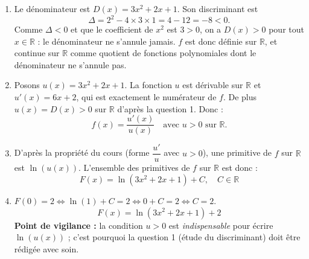 \documentclass[11pt]{article}
\begin{document}
\begin{corrige}
\begin{enumerate}
\item Le dénominateur est $D(x) = 3x^2 + 2x + 1$. Son discriminant est
\[ \Delta = 2^2 - 4 \times 3 \times 1 = 4 - 12 = -8 < 0. \]
Comme $\Delta < 0$ et que le coefficient de $x^2$ est $3 > 0$, on a $D(x) > 0$ pour tout $x \in \mathbb{R}$ : le dénominateur ne s'annule jamais. $f$ est donc définie sur $\mathbb{R}$, et continue sur $\mathbb{R}$ comme quotient de fonctions polynomiales dont le dénominateur ne s'annule pas.
\item Posons $u(x) = 3x^2 + 2x + 1$. La fonction $u$ est dérivable sur $\mathbb{R}$ et $u'(x) = 6x + 2$, qui est exactement le numérateur de $f$. De plus $u(x) = D(x) > 0$ sur $\mathbb{R}$ d'après la question 1. Donc :
\[ f(x) = \frac{u'(x)}{u(x)} \quad \text{avec } u > 0 \text{ sur } \mathbb{R}. \]
\item D'après la propriété du cours (forme $\dfrac{u'}{u}$ avec $u > 0$), une primitive de $f$ sur $\mathbb{R}$ est $\ln(u(x))$. L'ensemble des primitives de $f$ sur $\mathbb{R}$ est donc :
\[ \boxed{F(x) = \ln\left(3x^2 + 2x + 1\right) + C, \quad C \in \mathbb{R}} \]
\item $F(0) = 2 \iff \ln(1) + C = 2 \iff 0 + C = 2 \iff C = 2$.
\[ \boxed{F(x) = \ln\left(3x^2 + 2x + 1\right) + 2} \]
\textbf{Point de vigilance :} la condition $u > 0$ est \emph{indispensable} pour écrire $\ln(u(x))$ ; c'est pourquoi la question 1 (étude du discriminant) doit être rédigée avec soin.
\end{enumerate}
\end{corrige}
\end{document}
